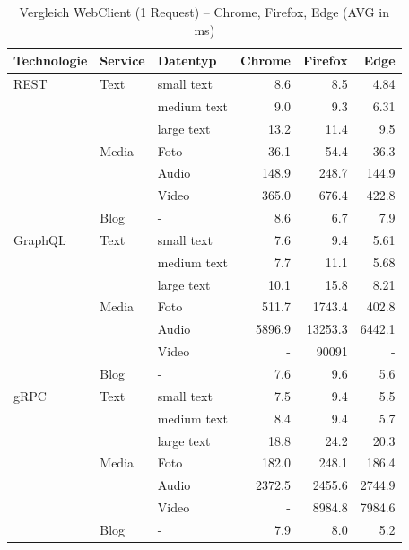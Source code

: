 	\begin{table}[h]
		\centering
		\caption{Vergleich WebClient (1 Request) – Chrome, Firefox, Edge (AVG in ms)}
		\label{tab:browser-comparison-1req}
		\renewcommand{\arraystretch}{1.2}
		\begin{tabular}{|l|l|l|r|r|r|}
			\hline
			\textbf{Technologie} & \textbf{Service} & \textbf{Datentyp} & \textbf{Chrome} & \textbf{Firefox} & \textbf{Edge} \\
			\hline
			REST & Text  & small text  & 8.6   & 8.5   & 4.84 \\
			&       & medium text & 9.0   & 9.3   & 6.31 \\
			&       & large text  & 13.2  & 11.4  & 9.5  \\
			& Media & Foto        & 36.1  & 54.4  & 36.3 \\
			&       & Audio       & 148.9 & 248.7 & 144.9 \\
			&       & Video       & 365.0 & 676.4 & 422.8 \\
			& Blog  & -           & 8.6   & 6.7   & 7.9  \\
			\hline
			GraphQL & Text  & small text  & 7.6   & 9.4   & 5.61 \\
			&       & medium text & 7.7   & 11.1  & 5.68 \\
			&       & large text  & 10.1  & 15.8  & 8.21 \\
			& Media & Foto        & 511.7 & 1743.4 & 402.8 \\
			&       & Audio       & 5896.9 & 13253.3 & 6442.1 \\
			&       & Video       & -     & 90091  & - \\
			& Blog  & -           & 7.6   & 9.6   & 5.6 \\
			\hline
			gRPC & Text  & small text  & 7.5   & 9.4   & 5.5 \\
			&       & medium text & 8.4   & 9.4   & 5.7 \\
			&       & large text  & 18.8  & 24.2  & 20.3 \\
			& Media & Foto        & 182.0 & 248.1 & 186.4 \\
			&       & Audio       & 2372.5 & 2455.6 & 2744.9 \\
			&       & Video       & -     & 8984.8 & 7984.6 \\
			& Blog  & -           & 7.9   & 8.0   & 5.2 \\
			\hline
		\end{tabular}
	\end{table}

\clearpage

